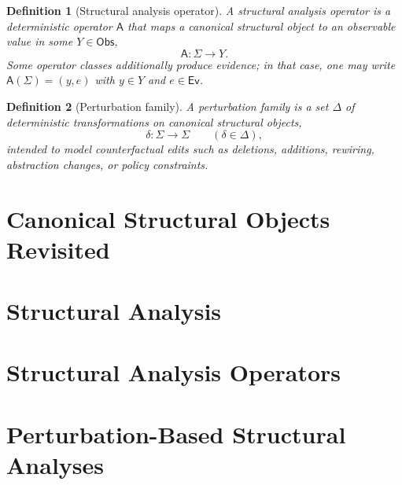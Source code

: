\documentclass[11pt]{article}
\newtheorem{definition}{Definition}
\begin{document}
\begin{definition}[Structural analysis operator]
\label{def:structural-analysis-operator}
A \emph{structural analysis operator} is a deterministic operator $\mathsf A$ that maps a canonical structural object to an observable value in some $Y\in\mathsf{Obs}$,
\[
\mathsf A: \Sigma \to Y.
\]
Some operator classes additionally produce evidence; in that case, one may write $\mathsf A(\Sigma)=(y,e)$ with $y\in Y$ and $e\in\mathsf{Ev}$.
\end{definition}

\begin{definition}[Perturbation family]
\label{def:perturbation-family}
A \emph{perturbation family} is a set $\Delta$ of deterministic transformations on canonical structural objects,
\[
\delta: \Sigma \to \Sigma \qquad (\delta\in\Delta),
\]
intended to model counterfactual edits such as deletions, additions, rewiring, abstraction changes, or policy constraints.
\end{definition}

\section{Canonical Structural Objects Revisited}
\label{sec:canonical-structural-objects-revisited}

\section{Structural Analysis}
\label{sec:structural-analysis}

\section{Structural Analysis Operators}
\label{sec:structural-analysis-operators}

\section{Perturbation-Based Structural Analyses}
\label{sec:perturbation-based-analyses}
\end{document}
